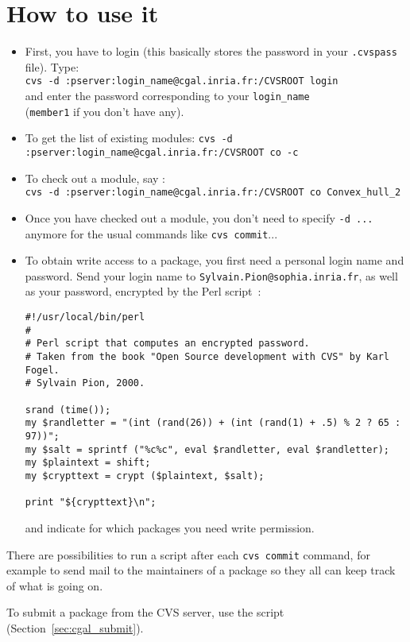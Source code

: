 \section{How to use it}
\label{sec:cvs_how_to}

\begin{itemize}
\item
    First, you have to login (this basically stores the password in your
    \texttt{.cvspass} file). Type: \\
    \texttt{cvs -d :pserver:login\_name@cgal.inria.fr:/CVSROOT login} \\
    and enter the password corresponding to your \texttt{login\_name} \\
    (\texttt{member1} if you don't have any).
\item
    To get the list of existing modules:
    \texttt{cvs -d :pserver:login\_name@cgal.inria.fr:/CVSROOT co -c}
\item
    To check out a module, say : \\
    \texttt{cvs -d :pserver:login\_name@cgal.inria.fr:/CVSROOT co
    Convex\_hull\_2}
\item
    Once you have checked out a module, you don't need to specify
    \texttt{-d ...} anymore for the usual commands like \texttt{cvs commit}...
\item
    To obtain write access to a package, you first need a personal login
    name and password.  Send your login name to 
    {\texttt{Sylvain.Pion@sophia.inria.fr}}, as well as your password,
    encrypted by the Perl script~:
\begin{verbatim}
#!/usr/local/bin/perl
#
# Perl script that computes an encrypted password.
# Taken from the book "Open Source development with CVS" by Karl Fogel.
# Sylvain Pion, 2000.

srand (time());
my $randletter = "(int (rand(26)) + (int (rand(1) + .5) % 2 ? 65 : 97))";
my $salt = sprintf ("%c%c", eval $randletter, eval $randletter);
my $plaintext = shift;
my $crypttext = crypt ($plaintext, $salt);

print "${crypttext}\n";
\end{verbatim}

    and indicate for which packages you need write permission.
\end{itemize}

There are possibilities to run a script after each \texttt{cvs
commit} command, for example to send mail to the maintainers of
a package so they all can keep track of what is going on.

To submit a package from the CVS server, use the script
 (Section~\ref{sec:cgal_submit}).

